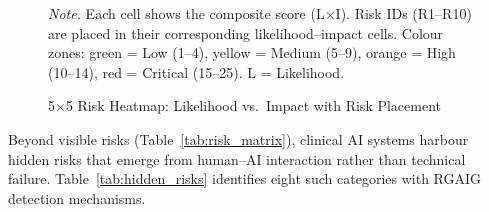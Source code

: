 \begin{figure}[!htbp]
{%
}
\caption[Risk Heatmap]{5$\times$5 Risk Heatmap: Likelihood vs.\ Impact with Risk Placement}
\vspace{0.5em}\noindent\textit{Note.} Each cell shows the composite score (L$\times$I). Risk IDs (R1--R10) are placed in their corresponding likelihood--impact cells. Colour zones: green = Low (1--4), yellow = Medium (5--9), orange = High (10--14), red = Critical (15--25). L = Likelihood.
\end{figure}

Beyond visible risks (Table~\ref{tab:risk_matrix}), clinical AI systems harbour hidden risks that emerge from human--AI interaction rather than technical failure. Table~\ref{tab:hidden_risks} identifies eight such categories with RGAIG detection mechanisms.

